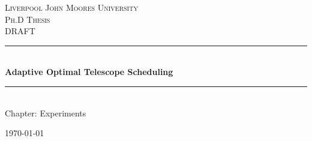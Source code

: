 \documentclass[12pt,a4paper]{article}
\newcommand{\HRule}{\rule{\linewidth}{0.5mm}}
\numberwithin{figure}{section}
\numberwithin{table}{section}
\numberwithin{algorithm}{section}
\begin{document}
\setlength{\parindent}{5mm}
\setlength{\parskip}{10pt plus2mm minus2mm}
\thispagestyle{empty}

\begin{titlepage}
 
\begin{center}
 
\textsc{\LARGE Liverpool John Moores University}\\[1.5cm]
 
\textsc{\Large Ph.D Thesis}\\[0.5cm]
\textsc{\large DRAFT}\\[0.5cm]
 
\HRule \\[0.4cm]
{ \Large \bfseries Adaptive Optimal Telescope Scheduling}\\[0.4cm]
 
\HRule \\[1.5cm]
 
{ \large Chapter: Experiments}
 
\vfill
 
{\large \today}
 
\end{center}
 
\end{titlepage}

\newpage
\tableofcontents




%





\end{document}
